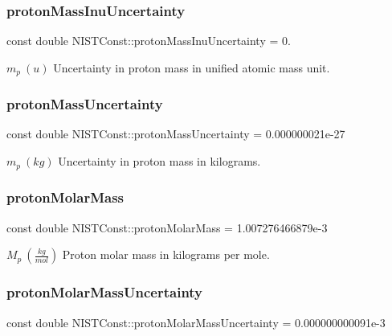 \subsubsection{\texorpdfstring{proton\+Mass\+Inu\+Uncertainty}{protonMassInuUncertainty}}
{\footnotesize\ttfamily const double N\+I\+S\+T\+Const\+::proton\+Mass\+Inu\+Uncertainty = 0.}

$m_p \ (u)$ Uncertainty in proton mass in unified atomic mass unit. \mbox{\label{group___proton_ga14f058f91a60fc3dff5e707b28b3f737}} 
\subsubsection{\texorpdfstring{proton\+Mass\+Uncertainty}{protonMassUncertainty}}
{\footnotesize\ttfamily const double N\+I\+S\+T\+Const\+::proton\+Mass\+Uncertainty = 0.\+000000021e-\/27}

$m_p \ (kg)$ Uncertainty in proton mass in kilograms. \mbox{\label{group___proton_ga8a29760b90301104dbd9512674eccc4c}} 
\subsubsection{\texorpdfstring{proton\+Molar\+Mass}{protonMolarMass}}
{\footnotesize\ttfamily const double N\+I\+S\+T\+Const\+::proton\+Molar\+Mass = 1.\+007276466879e-\/3}

$M_p \ (\frac{kg}{mol})$ Proton molar mass in kilograms per mole. \mbox{\label{group___proton_gaac054defc21692cb5ce9ed0508c44b42}} 
\subsubsection{\texorpdfstring{proton\+Molar\+Mass\+Uncertainty}{protonMolarMassUncertainty}}
{\footnotesize\ttfamily const double N\+I\+S\+T\+Const\+::proton\+Molar\+Mass\+Uncertainty = 0.\+000000000091e-\/3}

